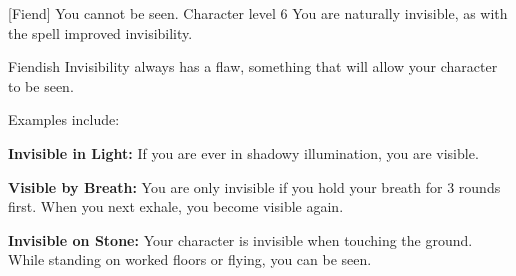  {[Fiend]}
\descfeat
{You cannot be seen.}
{Character level 6}
{You are naturally invisible, as with the spell improved invisibility.}
{Fiendish Invisibility always has a flaw, something that will allow your character to be seen.

Examples include:} \vspace*{-\baselineskip}

\begin{itemize*}
	\item\textbf{Invisible in Light:} {If you are ever in shadowy illumination, you are visible.}
	\item\textbf{Visible by Breath:} {You are only invisible if you hold your breath for 3 rounds first. When you next exhale, you become visible again.}
	\item\textbf{Invisible on Stone:} {Your character is invisible when touching the ground. While standing on worked floors or flying, you can be seen.}
\end{itemize*}\vspace{\baselineskip}